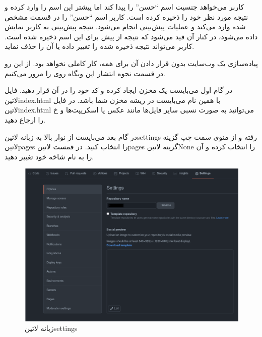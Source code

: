 \documentclass[../main.tex]{subfiles}
\begin{document}
 کاربر می‌خواهد جنسیت اسم ``حسن'' را پیدا کند اما پیشتر این اسم را وارد کرده و نتیجه مورد نظر خود را ذخیره کرده است.
 کاربر اسم ``حسن'' را در قسمت مشخص شده وارد می‌کند و عملیات پیش‌بینی انجام می‌شود.
 نتیجه پیش‌بینی به کاربر نمایش داده می‌شود، در کنار آن قید می‌شود که نتیجه از پیش برای این اسم ذخیره شده است.
 کاربر می‌تواند نتیجه ذخیره شده را تغییر داده یا آن را حذف نماید.


پیاده‌سازی یک وب‌سایت بدون قرار دادن آن برای همه، کار کاملی نخواهد بود. از این رو در قسمت نحوه انتشار این وبگاه روی  را مرور می‌کنیم.

در گام اول می‌بایست یک مخزن ایجاد کرده و کد خود را در آن قرار دهید. فایل ‌لاتین{index.html} با همین نام می‌بایست در ریشه مخزن شما باشد.
در فایل ‌لاتین{index.html} می‌توانید به صورت نسبی سایر فایل‌ها مانند عکس یا اسکریپت‌ها و ‌خ را ارجاع دهید.

در گام بعد می‌بایست از نوار بالا به زبانه ‌لاتین{settings} رفته و از منوی سمت چپ گزینه ‌لاتین{pages} را انتخاب کنید.
در قمست ‌لاتین{pages} گزینه ‌لاتین{None} را انتخاب کرده و آن را به نام شاخه خود تغییر دهید.

\begin{figure}[h]
  \centering
  \includegraphics[scale=0.3]{./github-step-1}
  \caption{زبانه ‌لاتین{settings}}
\end{figure}
\end{document}
